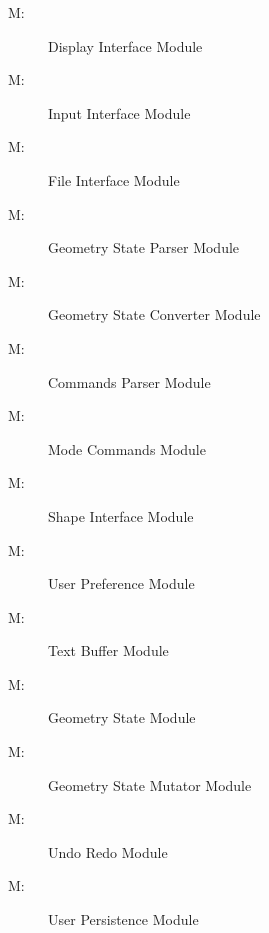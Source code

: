 \documentclass[12pt, titlepage]{article}
\newcounter{mnum}
\newcommand{\mthemnum}{M\themnum}
\begin{document}
\begin{description}
\item [ \mthemnum \label{mDI}:] Display Interface Module
\item [ \mthemnum \label{mII}:] Input Interface Module
\item [ \mthemnum \label{mFI}:] File Interface Module
\item [ \mthemnum \label{mGSP}:] Geometry State Parser Module
\item [ \mthemnum \label{mGSC}:] Geometry State Converter Module
\item [ \mthemnum \label{mCP}:] Commands Parser Module
\item [ \mthemnum \label{mMC}:] Mode Commands Module
\item [ \mthemnum \label{mSI}:] Shape Interface Module
\item [ \mthemnum \label{mUPref}:] User Preference Module
\item [ \mthemnum \label{mTB}:] Text Buffer Module
\item [ \mthemnum \label{mGS}:] Geometry State Module
\item [ \mthemnum \label{mGSM}:] Geometry State Mutator Module
\item [ \mthemnum \label{mUR}:] Undo Redo Module
\item [ \mthemnum \label{mUPer}:] User Persistence Module
\end{description}
\end{document}

